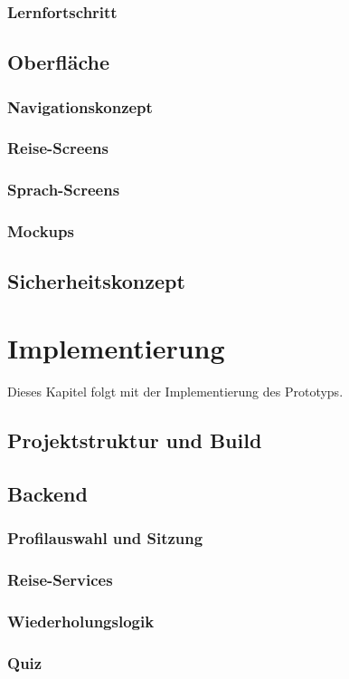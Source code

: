 \documentclass[12pt,a4paper]{scrreprt}
\begin{document}
\subsection{Lernfortschritt}
\section{Oberfläche}
\subsection{Navigationskonzept}
\subsection{Reise-Screens}
\subsection{Sprach-Screens}
\subsection{Mockups}
\section{Sicherheitskonzept}

\chapter{Implementierung}
Dieses Kapitel folgt mit der Implementierung des Prototyps.
\section{Projektstruktur und Build}
\section{Backend}
\subsection{Profilauswahl und Sitzung}
\subsection{Reise-Services}
\subsection{Wiederholungslogik}
\subsection{Quiz}
\end{document}

